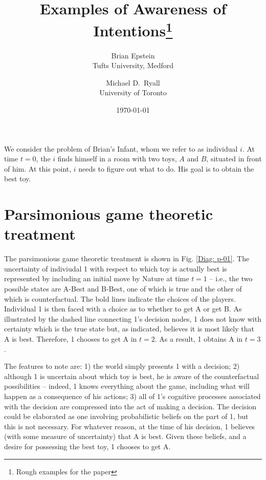 \documentclass[
11pt,
titlepage,
reqno,
]{article}%
\theoremstyle{definition}
\begin{document}
	
\title
{
	Examples of Awareness of Intentions\thanks{Rough examples for the paper}
}
\author
{
	Brian Epstein \\Tufts University, Medford
	\and 
	Michael D.\ Ryall \\University of Toronto 
}
\date{\today}
\maketitle
	
	
	
\def\baselinestretch{1.5}\small\normalsize
\newcommand{\ra}[1]{\renewcommand{\arraystretch}{#1}}%
\newpage

We consider the problem of Brian's Infant, whom we refer to as individual $i$. At time $t=0$, the $i$ finds himself in a room with two toys, $A$ and $B$, situated in front of him. At this point, $i$ needs to figure out what to do. His goal is to obtain the best toy.  

\section*{Parsimonious game theoretic treatment}
The parsimonious game theoretic treatment is shown in Fig. \ref{Diag: p-01}. The uncertainty of indiviudal 1 with respect to which toy is actually best is represented by including an initial move by Nature at time $t=1$ -- i.e., the two possible states are A-Best and B-Best, one of which is true and the other of which is counterfactual. The bold lines indicate the choices of the players. Individual 1 is then faced with a choice as to whether to get A or get B. As illustrated by the dashed line connecting 1's decision nodes, 1 does not know with certainty which is the true state but, as indicated, believes it is most likely that A is best. Therefore, 1 chooses to get A in $t=2$. As a result, 1 obtains A in $t=3$.

The features to note are: 1) the world simply presents 1 with a decision; 2) although 1 is uncertain about which toy is best, he is aware of the counterfactual possibilities -- indeed, 1 knows everything about the game, including what will happen as a consequence of his actions; 3) all of 1's cognitive processes associated with the decision are compressed into the act of making a decision. The decision could be elaborated as one involving probabilistic beliefs on the part of 1, but this is not necessary. For whatever reason, at the time of his decision, 1 believes (with some measure of uncertainty) that A is best. Given these beliefs, and a desire for possessing the best toy, 1 chooses to get A.
\end{document}
